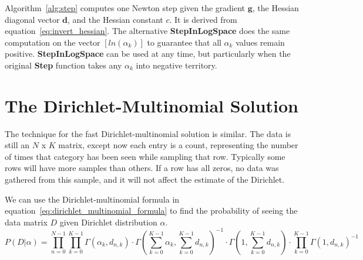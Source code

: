 \documentclass[twoside]{article}
\begin{document}
Algorithm~\ref{alg:step} computes one Newton step given the gradient $\mathbf{g}$, the Hessian diagonal vector $\mathbf{d}$, and the Hessian constant $c$. It is derived from equation~\eqref{eq:invert_hessian}. The alternative \textbf{StepInLogSpace} does the same computation on the vector \([ln(\alpha_k)]\) to guarantee that all \(\alpha_k\) values remain positive. \textbf{StepInLogSpace} can be used at any time, but particularly when the original \textbf{Step} function takes any \(\alpha_k\) into negative territory.

\section{The Dirichlet-Multinomial Solution}

The technique for the fast Dirichlet-multinomial solution is similar. The data is still an $N$ x $K$ matrix, except now each entry is a count, representing the number of times that category has been seen while sampling that row. Typically some rows will have more samples than others.  If a row has all zeros, no data was gathered from this sample, and it will not affect the estimate of the Dirichlet.

We can use the Dirichlet-multinomial formula in equation~\eqref{eq:dirichlet_multinomial_formula} to find the probability of seeing the data matrix $D$ given Dirichlet distribution \(\alpha\).
\[
P(D|\alpha)= \prod_{n=0}^{N-1}\prod_{k=0}^{K-1}\Gamma\left(\alpha_k,d_{n,k}\right)\cdot\Gamma\left(\sum_{k=0}^{K-1}\alpha_k,\sum_{k=0}^{K-1}d_{n,k}\right)^{-1}\cdot\Gamma\left(1,\sum_{k=0}^{K-1}d_{n,k}\right)\cdot\prod_{k=0}^{K-1}\Gamma\left(1,d_{n,k}\right)^{-1}
\]
\end{document}
